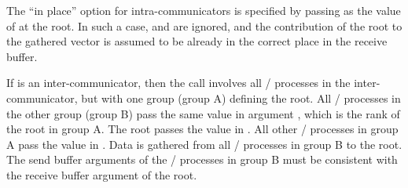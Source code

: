 The ``in place'' option  for intra-communicators is specified by passing
 as
the value of  at the root.  In such a case,
 and  are ignored, and the
contribution of the root to the gathered vector is assumed to be already
in the correct place in the receive buffer.

If  is an inter-communicator, then the call involves all
\MPI/ processes in the inter-communicator, but with one group (group A) defining the
root.  All \MPI/ processes in the other group (group B) pass the same value
in argument
, which is the rank of the root in group A.  The root
passes the value  in .
All other \MPI/ processes in group A pass the value  in
.
Data is gathered from all \MPI/ processes in group B to the root.
The send
buffer arguments of the \MPI/ processes in group B must be consistent with
the receive buffer argument of the root.

